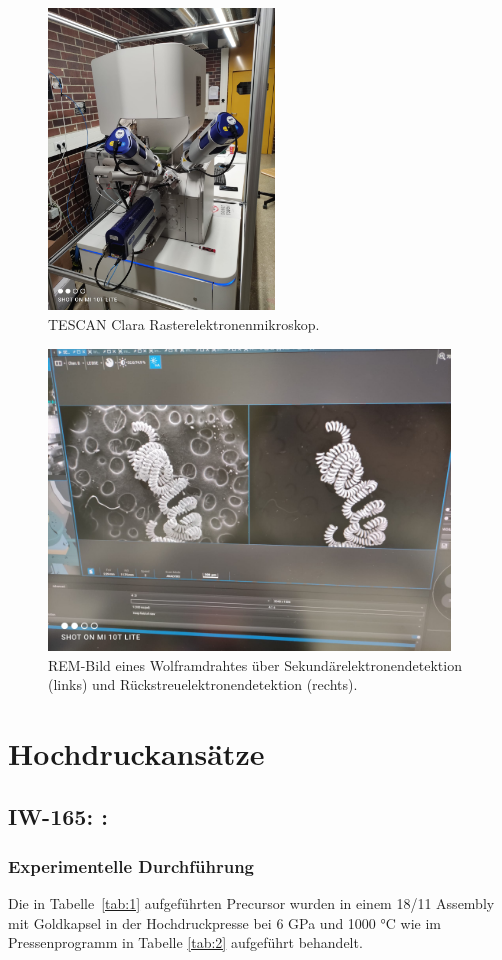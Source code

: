 \documentclass[12pt]{article}
\begin{document}
\begin{figure}[H]
    \centering
    \includegraphics[height=8cm]{Images/REM.jpeg}
    \caption{TESCAN Clara Rasterelektronenmikroskop.}
\end{figure}

\begin{figure}[H]
    \centering
    \includegraphics[height=8cm]{Images/REM1.jpeg}
    \caption{REM-Bild eines Wolframdrahtes über Sekundärelektronendetektion (links) und Rückstreuelektronendetektion (rechts).}
\end{figure}

\section{Hochdruckansätze}
\subsection{IW-165:  : }
\subsubsection{Experimentelle Durchführung}
Die in Tabelle~\ref{tab:1} aufgeführten Precursor wurden in einem 18/11 Assembly mit Goldkapsel in der Hochdruckpresse bei 6 GPa und 1000 \si{\degreeCelsius} wie im Pressenprogramm in Tabelle \ref{tab:2} aufgeführt behandelt.
\end{document}
